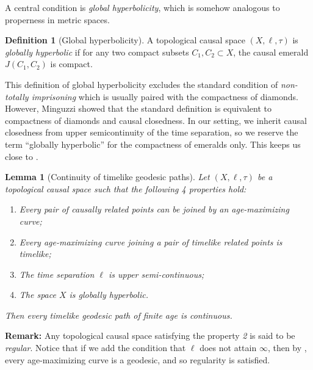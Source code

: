 \documentclass{article}
\newtheorem{lemma}[theorem]{Lemma}
\theoremstyle{definition}
\newtheorem{defn}{Definition}[section]
\begin{document}
A central condition is {\it global hyperbolicity}, which is somehow analogous to properness in metric spaces. 

\begin{defn}[Global hyperbolicity]
A topological causal space $(X,\ell, \tau)$ is {\it globally hyperbolic} if for any two compact subsets $C_1,C_2\subset X$, the causal emerald $J(C_1,C_2)$ is compact. 
\end{defn}

This definition of global hyperbolicity excludes the standard condition of {\it non-totally imprisoning} which is usually paired with the compactness of diamonds. However, Minguzzi showed that the standard definition is equivalent to compactness of diamonds and causal closedness. In our setting, we inherit causal closedness from upper semicontinuity of the time separation, so we reserve the term ``globally hyperbolic'' for the compactness of emeralds only. This keeps us close to \cite{Octet}.


\begin{lemma}[Continuity of timelike geodesic paths]\label{geodesicpathtocurve}
Let $(X,\ell, \tau)$ be a topological causal space such that the following 4  properties hold: 
\begin{enumerate}
\item Every pair of causally related points can be joined by an age-maximizing curve;
\item Every age-maximizing curve joining a pair of timelike related points is timelike;
\item The time separation $\ell$ is upper semi-continuous;
\item The space $X$ is globally hyperbolic.
\end{enumerate}
Then every timelike geodesic path of finite age is continuous.
\end{lemma}
{\bf Remark:} Any topological causal space satisfying the property {\it 2} is said to be {\it regular}. Notice that if we add the condition that $\ell$ does not attain $\infty$, then by , every age-maximizing curve is a geodesic, and so regularity is satisfied.
\end{document}
